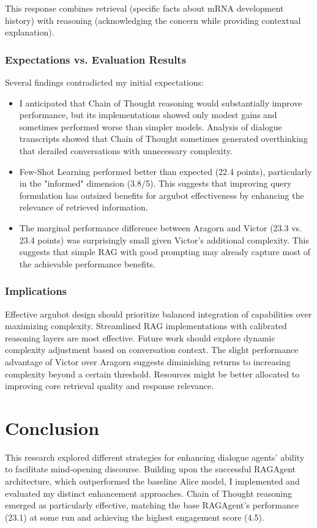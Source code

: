 \documentclass[11pt]{article}
\begin{document}
This response combines retrieval (specific facts about mRNA development history) with reasoning (acknowledging the concern while providing contextual explanation).

\subsubsection{Expectations vs. Evaluation Results}

Several findings contradicted  my initial expectations:
\begin{itemize}
\item I anticipated that Chain of Thought reasoning would substantially improve performance, but its implementations showed only modest gains and sometimes performed worse than simpler models. Analysis of dialogue transcripts showed that Chain of Thought sometimes generated overthinking that derailed conversations with unnecessary complexity.

\item Few-Shot Learning performed better than expected (22.4 points), particularly in the "informed" dimension (3.8/5). This suggests that improving query formulation has outsized benefits for argubot effectiveness by enhancing the relevance of retrieved information.

\item The marginal performance difference between Aragorn and Victor (23.3 vs. 23.4 points) was surprisingly small given Victor's additional complexity. This suggests that simple RAG with good prompting may already capture most of the achievable performance benefits.
\end{itemize}

\subsubsection{Implications}

Effective argubot design should prioritize balanced integration of capabilities over maximizing complexity. Streamlined RAG implementations with calibrated reasoning layers are most effective. Future work should explore dynamic complexity adjustment based on conversation context. The slight performance advantage of Victor over Aragorn suggests diminishing returns to increasing complexity beyond a certain threshold. Resources might be better allocated to improving core retrieval quality and response relevance.


\section{Conclusion}
This research explored different strategies for enhancing dialogue agents' ability to facilitate mind-opening discourse. Building upon the successful RAGAgent architecture, which outperformed the baseline Alice model, I implemented and evaluated my distinct enhancement approaches. Chain of Thought reasoning emerged as particularly effective, matching the base RAGAgent's performance (23.1) at some run and achieving the highest engagement score (4.5).
\end{document}
